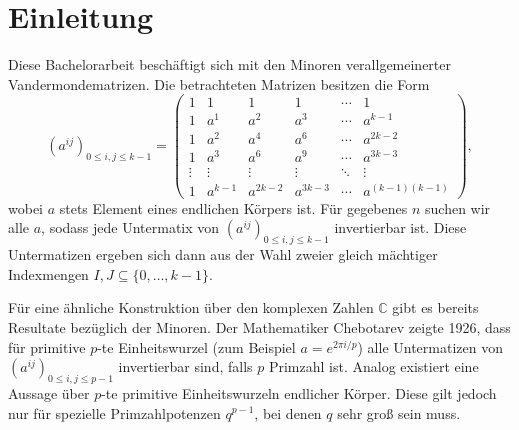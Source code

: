 \section{Einleitung}

Diese Bachelorarbeit beschäftigt sich mit den Minoren verallgemeinerter Vandermondematrizen. Die betrachteten Matrizen besitzen die Form \begin{equation*}
    \left( a^{ij} \right)_{0\leq i,j \leq k-1} = \begin{pmatrix}
        1     & 1    & 1    & 1    &\cdots& 1 \\
        1     & a^1  & a^2  & a^3  &\cdots& a^{k-1} \\
        1     & a^2  & a^4  & a^6  &\cdots& a^{2k-2} \\
        1     & a^3  & a^6  & a^9  &\cdots& a^{3k-3} \\
        \vdots&\vdots&\vdots&\vdots&\ddots&\vdots \\
        1     &a^{k-1}&a^{2k-2}&a^{3k-3}&\cdots&a^{(k-1)(k-1)}
    \end{pmatrix},
\end{equation*}
wobei $a$ stets Element eines endlichen Körpers ist. Für gegebenes $n$ suchen wir alle $a$, sodass jede Untermatix von $\left( a^{ij} \right)_{0\leq i,j \leq k-1}$ invertierbar ist.
Diese Untermatizen ergeben sich dann aus der Wahl zweier gleich mächtiger Indexmengen $I,J \subseteq \{0, \dots, k-1\}$.

Für eine ähnliche Konstruktion über den komplexen Zahlen $\mathbb{C}$ gibt es bereits Resultate bezüglich der Minoren. Der Mathematiker Chebotarev zeigte 1926, dass für primitive $p$-te Einheitswurzel (zum Beispiel $a=e^{2\pi i/p}$) alle Untermatizen von $\left( a^{ij} \right)_{0\leq i,j \leq p-1}$ invertierbar sind, falls $p$ Primzahl ist. \cite{CheboProof}
Analog existiert eine Aussage über $p$-te primitive Einheitswurzeln endlicher Körper. Diese gilt jedoch nur für spezielle Primzahlpotenzen $q^{p-1}$, bei denen $q$ sehr groß sein muss. \cite{CheboFiniteFields}
